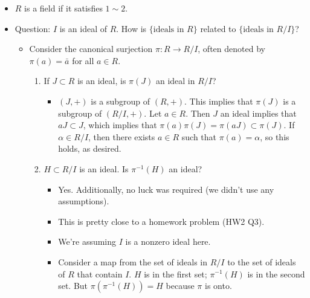 \documentclass[../notes.tex]{subfiles}
\begin{document}
\begin{itemize}
\begin{enumerate}
            \item There are exactly two ideals of $R$ (specifically, $\{0\}$ and $R$).
        \end{enumerate}
        \begin{proof}
            \underline{$(2)\Rightarrow(1)$} is easy. Implies $1\neq 0$ check. If $a\in R$, $a\neq 0$, then $\{0\}\subsetneq Ra$. The hypothesis implies that $Ra=R$ and $1\in R$. Thus, there exists $b\in R$ such that $ba=1$.\par
            \underline{$(1)\Rightarrow(2)$}: Not covered in class.
        \end{proof}
    \item $R$ is a field if it satisfies $1\sim 2$.
    \item Question: $I$ is an ideal of $R$. How is $\{\text{ideals in }R\}$ related to $\{\text{ideals in }R/I\}$?
    \begin{itemize}
        \item Consider the canonical surjection $\pi:R\to R/I$, often denoted by $\pi(a)=\bar{a}$ for all $a\in R$.
        \begin{enumerate}[label={(\alph*)}]
            \item If $J\subset R$ is an ideal, is $\pi(J)$ an ideal in $R/I$?
            \begin{itemize}
                \item $(J,+)$ is a subgroup of $(R,+)$. This implies that $\pi(J)$ is a subgroup of $(R/I,+)$. Let $a\in R$. Then $J$ an ideal implies that $aJ\subset J$, which implies that $\pi(a)\pi(J)=\pi(aJ)\subset\pi(J)$. If $\alpha\in R/I$, then there exists $a\in R$ such that $\pi(a)=\alpha$, so this holds, as desired.
            \end{itemize}
            \item $H\subset R/I$ is an ideal. Is $\pi^{-1}(H)$ an ideal?
            \begin{itemize}
                \item Yes. Additionally, no luck was required (we didn't use any assumptions).
                \item This is pretty close to a homework problem (HW2 Q3).
                \item We're assuming $I$ is a nonzero ideal here.
                \item Consider a map from the set of ideals in $R/I$ to the set of ideals of $R$ that contain $I$. $H$ is in the first set; $\pi^{-1}(H)$ is in the second set. But $\pi(\pi^{-1}(H))=H$ because $\pi$ is onto.

\end{itemize}
\end{enumerate}
\end{itemize}
\end{itemize}
\end{document}
